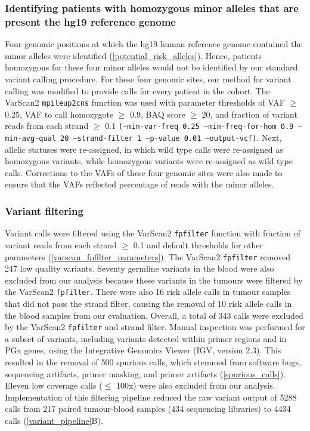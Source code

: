 \documentclass{bmcart}
\begin{document}
\subsubsection*{Identifying patients with homozygous minor alleles that are present the hg19 reference genome}

Four genomic positions at which the hg19 human reference genome contained the minor alleles were identified (\autoref{potential_risk_alleles}). Hence, patients homozygous for these four minor alleles would not be identified by our standard variant calling procedure. For these four genomic sites, our method for variant calling was modified to provide calls for every patient in the cohort. The VarScan2 \texttt{mpileup2cns} function was used with parameter thresholds of VAF $\geq$ 0.25, VAF to call homozygote $\geq$ 0.9, BAQ score $\geq$ 20, and fraction of variant reads from each strand $\geq$ 0.1 \texttt{(--min-var-freq 0.25 --min-freq-for-hom 0.9 --min-avg-qual 20 --strand-filter 1 --p-value 0.01 --output-vcf)}. Next, allelic statuses were re-assigned, in which wild type calls were re-assigned as homozygous variants, while homozygous variants were re-assigned as wild type calls. Corrections to the VAFs of these four genomic sites were also made to ensure that the VAFs reflected percentage of reads with the minor alleles.

\subsubsection*{Variant filtering}

Variant calls were filtered using the VarScan2 \texttt{fpfilter} function with fraction of variant reads from each strand $\geq$ 0.1 and default thresholds for other parameters (\autoref{varscan_fpfilter_parameters}). The VarScan2 \texttt{fpfilter} removed 247 low quality variants. Seventy germline variants in the blood were also excluded from our analysis because these variants in the tumours were filtered by the VarScan2 \texttt{fpfilter}. There were also 16 risk allele calls in tumour samples that did not pass the strand filter, causing the removal of 10 risk allele calls in the blood samples from our evaluation. Overall, a total of 343 calls were excluded by the VarScan2 \texttt{fpfilter} and strand filter. Manual inspection was performed for a subset of variants, including variants detected within primer regions and in PGx genes, using the Integrative Genomics Viewer (IGV, version 2.3). This resulted in the removal of 500 spurious calls, which stemmed from software bugs, sequencing artifacts, primer masking, and primer artifacts (\autoref{spurious_calls}). Eleven low coverage calls ($\leq$ 100x) were also excluded from our analysis. Implementation of this filtering pipeline reduced the raw variant output of 5288 calls from 217 paired tumour-blood samples (434 sequencing libraries) to 4434 calls (\autoref{variant_pipeline}B).
\end{document}
